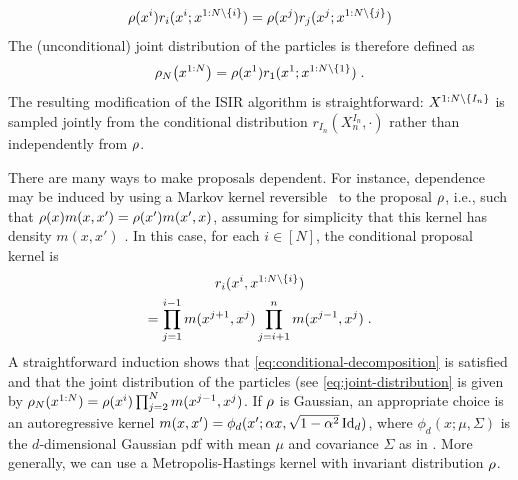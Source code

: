 \documentclass{article}
\begin{document}
\begin{equation}
\label{eq:conditional-decomposition}
\rho(x^i) r_i(x^i;x^{1:N \setminus \{i\}})=
\rho(x^j) r_j(x^{j};x^{1:N \setminus \{j\}})
\end{equation}
The (unconditional) joint distribution of the particles is therefore defined as
\begin{equation}
\label{eq:joint-distribution}
\rho_N\bigl(x^{1:N}\bigr) = \rho(x^1) r_1(x^1;x^{1:N \setminus \{1\}}) \;.
\end{equation}
The resulting modification of the ISIR algorithm is straightforward: $X^{1:N \setminus \{I_n\}}$ is sampled jointly from the conditional distribution $r_{I_n}(X_n^{I_n},\cdot)$ rather than independently from $\rho$.

There are many ways to make proposals dependent. For instance, dependence may be induced by using a Markov kernel reversible \wrt\ to the proposal $\rho$, i.e., such that $\rho(x) m(x,x')= \rho(x') m(x',x)$, assuming for simplicity that this kernel has density $m(x,x')$ \citep{ruiz:titsias:doucet:2020}. In this case, for each $i \in [N]$, the conditional proposal kernel is
\begin{multline}
\label{eq:condition-kernel}
r_i(x^i,x^{1:N \setminus \{i\}}) \\ =
\prod_{j=1}^{i-1} m(x^{j+1},x^{j}) \prod_{j=i+1}^n m(x^{j-1},x^j) \;.
\end{multline}
A straightforward induction shows that \eqref{eq:conditional-decomposition} is satisfied and that the joint distribution of the particles (see \eqref{eq:joint-distribution} is given by  $\rho_N(x^{1:N})=\rho(x^i) \prod_{j=2}^{N} m(x^{j-1},x^j)$. If $\rho$ is Gaussian, an appropriate choice is an autoregressive kernel $m(x,x')= \phi_d(x';\alpha x, \sqrt{1-\alpha^2} \operatorname{Id}_d)$, where $\phi_d(x; \mu, \Sigma)$ is the $d$-dimensional Gaussian pdf with mean $\mu$ and covariance $\Sigma$ as in  \citep{ruiz:titsias:doucet:2020}. More generally, we can use a Metropolis-Hastings kernel with invariant distribution $\rho$.
\end{document}
